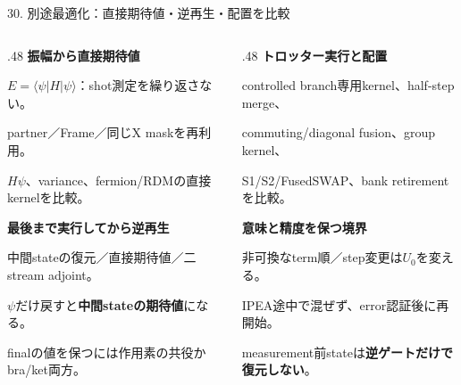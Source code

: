 \begin{frame}{30. 別途最適化：直接期待値・逆再生・配置を比較}
  \begin{columns}[T,onlytextwidth]
    \begin{column}{.48\textwidth}
      \textbf{振幅から直接期待値}\par
      \small $E=\langle\psi|H|\psi\rangle$：shot測定を繰り返さない。\par
      partner／Frame／同じX maskを再利用。\par
      $H\psi$、variance、fermion/RDMの直接kernelを比較。\par\medskip
      \textbf{最後まで実行してから逆再生}\par
      \small 中間stateの復元／直接期待値／二stream adjoint。\par
      $\psi$だけ戻すと\textbf{中間stateの期待値}になる。\par
      finalの値を保つには作用素の共役かbra/ket両方。
    \end{column}
    \begin{column}{.48\textwidth}
      \textbf{トロッター実行と配置}\par
      \small controlled branch専用kernel、half-step merge、\par
      commuting/diagonal fusion、group kernel、\par
      S1/S2/FusedSWAP、bank retirementを比較。\par\medskip
      \textbf{意味と精度を保つ境界}\par
      \small 非可換なterm順／step変更は$U_0$を変える。\par
      IPEA途中で混ぜず、error認証後に再開始。\par
      measurement前stateは\textbf{逆ゲートだけで復元しない}。
    \end{column}
  \end{columns}
\end{frame}

